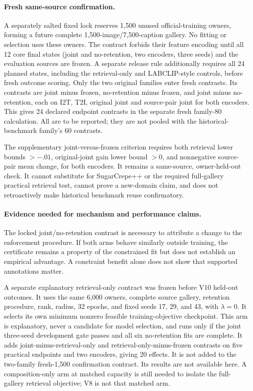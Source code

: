 \documentclass[11pt]{article}
\begin{document}
\paragraph{Fresh same-source confirmation.}
A separately salted fixed lock reserves 1,500 unused official-training
owners, forming a future complete 1,500-image/7,500-caption gallery.
No fitting or selection uses these owners. The contract forbids their
feature encoding until all 12 core final states (joint and no-retention,
two encoders, three seeds) and the evaluation sources are frozen. A
separate release rule additionally requires all 24 planned states,
including the retrieval-only and LABCLIP-style controls, before fresh
outcome scoring. Only the two original families enter fresh contrasts.
Its contrasts are joint minus frozen, no-retention minus frozen, and joint
minus no-retention, each on I2T, T2I, original joint and source-pair joint
for both encoders. This gives 24 declared endpoint contrasts in the
separate fresh family-80 calculation. All are to be reported; they are not
pooled with the historical-benchmark family's 60 contrasts.

The supplementary joint-versus-frozen criterion requires both retrieval
lower bounds $>-.01$, original-joint gain lower bound $>0$, and nonnegative
source-pair mean change, for both encoders. It remains a same-source,
owner-held-out check. It cannot substitute for SugarCrepe++ or the required
full-gallery practical retrieval test, cannot prove a new-domain claim,
and does not retroactively make historical benchmark reuse confirmatory.

\paragraph{Evidence needed for mechanism and performance claims.}
The locked joint/no-retention contrast is necessary to attribute a change
to the enforcement procedure. If both arms behave similarly outside
training, the certificate remains a property of the constrained fit but
does not establish an empirical advantage. A constraint benefit alone
does not show that supported annotations matter.

A separate explanatory retrieval-only contract was frozen before
V10 held-out outcomes. It uses the same 6,000 owners, complete source
gallery, retention procedure, rank, radius, 32 epochs, and fixed seeds
17, 29, and 43, with $\lambda=0$. It selects its own minimum nonzero
feasible training-objective checkpoint. This arm is explanatory, never a
candidate for model selection, and runs only if the joint three-seed
development gate passes and all six no-retention fits are complete. It
adds joint-minus-retrieval-only and retrieval-only-minus-frozen contrasts
on five practical endpoints and two encoders, giving 20 effects. It is
not added to the two-family fresh-1,500
confirmation contract. Its results are not available here.
A composition-only arm at matched capacity is still needed to isolate
the full-gallery retrieval objective; V8 is not that matched arm.
\end{document}
